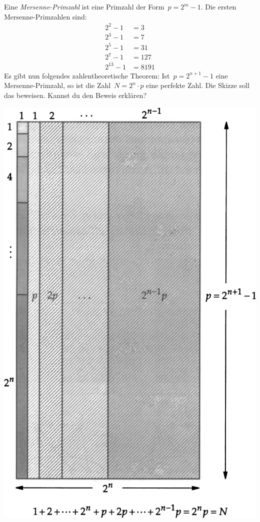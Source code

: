 \documentclass{../../zirkelblatt}
\begin{document}
Eine \emph{Mersenne-Primzahl} ist eine Primzahl der Form~$p = 2^m-1$. Die ersten
Mersenne-Primzahlen sind:
\begin{align*}
  2^2 - 1 &= 3 \\
  2^3 - 1 &= 7 \\
  2^5 - 1 &= 31 \\
  2^7 - 1 &= 127 \\
  2^{13} - 1 &= 8191
\end{align*}
Es gibt nun folgendes zahlentheoretische Theorem: Ist~$p = 2^{n+1}-1$ eine
Mersenne-Primzahl, so ist die Zahl~$N = 2^n \cdot p$ eine perfekte Zahl. Die
Skizze soll das beweisen. Kannst du den Beweis erklären?
\begin{center}
\includegraphics[scale=0.5]{mersenne-perfekt}
\end{center}
\end{document}
